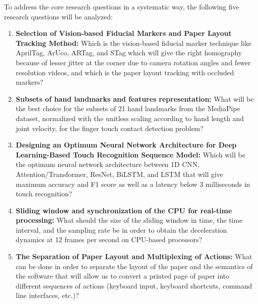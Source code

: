 To address the core research questions in a systematic way, the following five research questions will be analyzed:
\begin{enumerate}
    \item \textbf{Selection of Vision-based Fiducial Markers and Paper Layout Tracking Method:} Which is the vision-based fiducial marker technique like AprilTag, ArUco, ARTag, and STag which will give the right homography because of lesser jitter at the corner due to camera rotation angles and fewer resolution videos, and which is the paper layout tracking with occluded markers?
    \item \textbf{Subsets of hand landmarks and features representation:} What will be the best choice for the subsets of 21 hand landmarks from the MediaPipe dataset, normalized with the unitless scaling according to hand length and joint velocity, for the finger touch contact detection problem?
    \item \textbf{Designing an Optimum Neural Network Architecture for Deep Learning-Based Touch Recognition Sequence Model:} Which will be the optimum neural network architecture between 1D CNN, Attention/Transformer, ResNet, BiLSTM, and LSTM that will give maximum accuracy and F1 score as well as a latency below 3 milliseconds in touch recognition?
    \item \textbf{Sliding window and synchronization of the CPU for real-time processing:} What should the size of the sliding window in time, the time interval, and the sampling rate be in order to obtain the deceleration dynamics at 12 frames per second on CPU-based processors?
    \item \textbf{The Separation of Paper Layout and Multiplexing of Actions:} What can be done in order to separate the layout of the paper and the semantics of the software that will allow us to convert a printed page of paper into different sequences of actions (keyboard input, keyboard shortcuts, command line interfaces, etc.)?
\end{enumerate}

